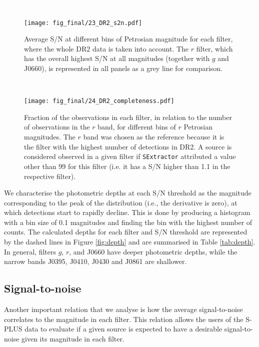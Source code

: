 \documentclass[fleqn,usenatbib]{mnras}
\begin{document}
\begin{figure}\textcolor{white}{[h!]}
\begin{center}
\texttt{[image: fig\_final/23\_DR2\_s2n.pdf]}
\caption{\label{fig:s2n} Average S/N at different bins of Petrosian magnitude for each filter, where the whole DR2 data is taken into account. The $r$ filter, which has the overall highest S/N at all magnitudes (together with $g$ and J0660), is represented in all panels as a grey line for comparison.}
\end{center}
\end{figure}

\begin{figure}\textcolor{white}{[h!]}
\begin{center}
\texttt{[image: fig\_final/24\_DR2\_completeness.pdf]}
\caption{\label{fig:completeness} Fraction of the observations in each filter, in relation to the number of observations in the $r$ band, for different bins of $r$ Petrosian magnitudes. The $r$ band was chosen as the reference because it is the filter with the highest number of detections in DR2. A source is considered observed in a given filter if \texttt{SExtractor} attributed a value other than 99 for this filter (i.e. it has a S/N higher than 1.1 in the respective filter).}
\end{center}
\end{figure}


We characterise the photometric depths at each S/N threshold as the magnitude corresponding to the peak of the distribution (i.e., the derivative is zero), at which detections start to rapidly decline. This is done by producing a histogram with a bin size of 0.1 magnitudes and finding the bin with the highest number of counts. The calculated depths for each filter and S/N threshold are represented by the dashed lines in Figure \ref{fig:depth} and are summarised in Table \ref{tab:depth}. In general, filters $g$, $r$, and J0660 have deeper photometric depths, while the narrow bands J0395, J0410, J0430 and J0861 are shallower.

\subsection{Signal-to-noise}

Another important relation that we analyse is how the average signal-to-noise correlates to the magnitude in each filter. This relation allows the users of the S-PLUS data to evaluate if a given source is expected to have a desirable signal-to-noise given its magnitude in each filter.
\end{document}
